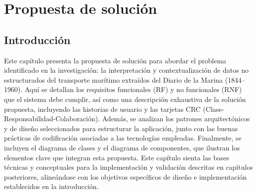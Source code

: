 \chapter{Propuesta de solución}
\label{chap:chapter2}

\section*{Introducción}
Este capítulo presenta la propuesta de solución para abordar el problema identificado en la investigación: la interpretación y contextualización de datos no estructurados del transporte marítimo extraídos del Diario de la Marina (1844–1960). Aquí se detallan los requisitos funcionales (RF) y no funcionales (RNF) que el sistema debe cumplir, así como una descripción exhaustiva de la solución propuesta, incluyendo las historias de usuario y las tarjetas CRC (Clase-Responsabilidad-Colaboración). Además, se analizan los patrones arquitectónicos y de diseño seleccionados para estructurar la aplicación, junto con las buenas prácticas de codificación asociadas a las tecnologías empleadas. Finalmente, se incluyen el diagrama de clases y el diagrama de componentes, que ilustran los elementos clave que integran esta propuesta. Este capítulo sienta las bases técnicas y conceptuales para la implementación y validación descritas en capítulos posteriores, alineándose con los objetivos específicos de diseño e implementación establecidos en la introducción.

